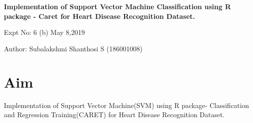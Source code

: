 \documentclass[a4paper,10pt]{article}
\begin{document}
\setcounter{secnumdepth}{-1} 
\begin{center}
\textbf{\LARGE  Implementation of Support Vector Machine Classification using R package - Caret for Heart Disease Recognition Dataset.}
\end{center}

\raggedright Expt No: 6 (b) \hfill \raggedleft May 8,2019 \\ 

\raggedright Author: Subalakshmi Shanthosi S (186001008) \par 

\noindent\makebox[\linewidth]{\rule{\textwidth}{1pt}} 

\section{Aim}
Implementation of Support Vector Machine(SVM) using R package- Classification and Regression Training(CARET) for Heart Disease Recognition Dataset.
\end{document}
